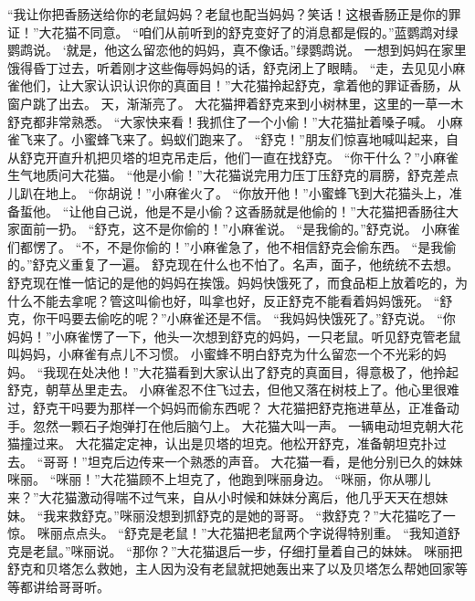 \documentclass[a4paper,12pt,UTF8,twoside]{ctexbook}
\begin{document}
        “我让你把香肠送给你的老鼠妈妈？老鼠也配当妈妈？笑话！这根香肠正是你的罪证！”大花猫不同意。 
        “咱们从前听到的舒克变好了的消息都是假的。”蓝鹦鹉对绿鹦鹉说。 
        ‘就是，他这么留恋他的妈妈，真不像话。”绿鹦鹉说。 
        一想到妈妈在家里饿得昏丁过去，听着刚才这些侮辱妈妈的话，舒克闭上了眼睛。 
        “走，去见见小麻雀他们，让大家认识认识你的真面目！”大花猫拎起舒克，拿着他的罪证香肠，从窗户跳了出去。 
        天，渐渐亮了。 
        大花猫押着舒克来到小树林里，这里的一草一木舒克都非常熟悉。 
        “大家快来看！我抓住了一个小偷！”大花猫扯着嗓子喊。 
        小麻雀飞来了。小蜜蜂飞来了。蚂蚁们跑来了。 
        “舒克！”朋友们惊喜地喊叫起来，自从舒克开直升机把贝塔的坦克吊走后，他们一直在找舒克。 
        “你干什么？”小麻雀生气地质问大花猫。 
        “他是小偷！”大花猫说完用力压丁压舒克的肩膀，舒克差点儿趴在地上。 
        “你胡说！”小麻雀火了。 
        “你放开他！”小蜜蜂飞到大花猫头上，准备蜇他。 
        “让他自己说，他是不是小偷？这香肠就是他偷的！”大花猫把香肠往大家面前一扔。 
        “舒克，这不是你偷的！”小麻雀说。 
        “是我偷的。”舒克说。 
        小麻雀们都愣了。 
        “不，不是你偷的！”小麻雀急了，他不相信舒克会偷东西。 
        “是我偷的。”舒克义重复了一遍。 
        舒克现在什么也不怕了。名声，面子，他统统不去想。舒克现在惟一惦记的是他的妈妈在挨饿。妈妈快饿死了，而食品柜上放着吃的，为什么不能去拿呢？管这叫偷也好，叫拿也好，反正舒克不能看着妈妈饿死。 
        “舒克，你干吗要去偷吃的呢？”小麻雀还是不信。 
        “我妈妈快饿死了。”舒克说。 
        “你妈妈！”小麻雀愣了一下，他头一次想到舒克的妈妈，一只老鼠。听见舒克管老鼠叫妈妈，小麻雀有点儿不习惯。 
        小蜜蜂不明白舒克为什么留恋一个不光彩的妈妈。 
        “我现在处决他！”大花猫看到大家认出了舒克的真面目，得意极了，他拎起舒克，朝草丛里走去。 
        小麻雀忍不住飞过去，但他又落在树枝上了。他心里很难过，舒克干吗要为那样一个妈妈而偷东西呢？ 
        大花猫把舒克拖进草丛，正准备动手。忽然一颗石子炮弹打在他后脑勺上。 
        大花猫大叫一声。 
        一辆电动坦克朝大花猫撞过来。 
        大花猫定定神，认出是贝塔的坦克。他松开舒克，准备朝坦克扑过去。 
        “哥哥！”坦克后边传来一个熟悉的声音。 
        大花猫一看，是他分别已久的妹妹咪丽。 
        “咪丽！”大花猫顾不上坦克了，他跑到咪丽身边。 
        “咪丽，你从哪儿来？”大花猫激动得喘不过气来，自从小时候和妹妹分离后，他几乎天天在想妹妹。 
        “我来救舒克。”咪丽没想到抓舒克的是她的哥哥。 
        “救舒克？”大花猫吃了一惊。 
        咪丽点点头。 
        “舒克是老鼠！”大花猫把老鼠两个字说得特别重。 
        “我知道舒克是老鼠。”咪丽说。 
        “那你？”大花猫退后一步，仔细打量着自己的妹妹。 
        咪丽把舒克和贝塔怎么救她，主人因为没有老鼠就把她轰出来了以及贝塔怎么帮她回家等等都讲给哥哥听。 
\end{document}
